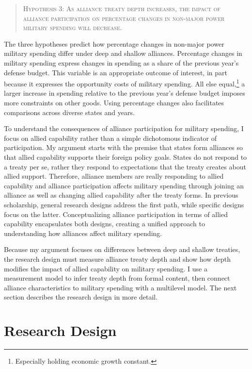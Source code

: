 \documentclass[12pt]{article}
\begin{document}
\begin{quote}
\textsc{Hypothesis 3: As alliance treaty depth increases, the impact of alliance participation on percentage changes in non-major power military spending will decrease.}
\end{quote}


The three hypotheses predict how percentage changes in non-major power military spending differ under deep and shallow alliances. 
Percentage changes in military spending express changes in spending as a share of the previous year's defense budget.
This variable is an appropriate outcome of interest, in part because it expresses the opportunity costs of military spending. 
All else equal,\footnote{Especially holding economic growth constant.} a larger increase in spending relative to the previous year's defense budget imposes more constraints on other goods. 
Using percentage changes also facilitates comparisons across diverse states and years. 


To understand the consequences of alliance participation for military spending, I focus on allied capability rather than a simple dichotomous indicator of participation.
My argument starts with the premise that states form alliances so that allied capability supports their foreign policy goals. 
States do not respond to a treaty per se, rather they respond to expectations that the treaty creates about allied support. 
Therefore, alliance members are really responding to allied capability and alliance participation affects military spending through joining an alliance as well as changing allied capability after the treaty forms. 
In previous scholarship, general research designs address the first path, while specific designs focus on the latter. 
Conceptualizing alliance participation in terms of allied capability encapsulates both designs, creating a unified approach to understanding how alliances affect military spending. 


Because my argument focuses on differences between deep and shallow treaties, the research design must measure alliance treaty depth and show how depth modifies the impact of allied capability on military spending.  
I use a measurement model to infer treaty depth from formal content, then connect alliance characteristics to military spending with a multilevel model. 
The next section describes the research design in more detail. 



\section{Research Design} 
\end{document}

